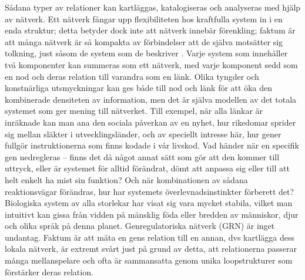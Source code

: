 Sådana typer av relationer kan kartläggas, katalogiseras och analyseras med hjälp av nätverk. Ett nätverk fångar upp flexibiliteten hos kraftfulla system in i en enda struktur; detta betyder dock inte att nätverk innebär förenkling; faktum är att många nätverk är så kompakta av förbindelser att de själva motsätter sig tolkning, just såsom de system som de beskriver \citep{dianati2016unwinding}. Varje system som innehåller två komponenter kan summeras som ett nätverk, med varje komponent sedd som en nod och deras relation till varandra som en länk. Olika tyngder och konstnärliga utsmyckningar kan ges både till nod och länk för att öka den kombinerade densiteten av information, men det är själva modellen av det totala systemet som ger mening till nätverket. Till exempel, när alla länkar är inräknade kan man ana den sociala påverkan av en nyhet, hur rikedomar sprider sig mellan släkter i utvecklingsländer, och av speciellt intresse här, hur gener fullgör instruktionerna som finns kodade i vår livskod. Vad händer när en specifik gen nedregleras – finns det då något annat sätt som gör att den kommer till uttryck, eller är systemet för alltid förändrat, dömt att anpassa sig eller till att helt enkelt ha mist sin funktion? Och när kombinationen av sådana reaktionsvägar förändras, hur har systemets överlevnadsinstinkter förberett det? Biologiska system av alla storlekar har visat sig vara mycket stabila, vilket man intuitivt kan gissa från vidden på mänsklig föda eller bredden av människor, djur och olika språk på denna planet. Genregulatoriska nätverk (GRN) är inget undantag. Faktum är att mäta en gens relation till en annan, dvs kartlägga dess lokala nätverk, är extremt svårt just på grund av detta, att relationerna passerar många mellanspelare och ofta är sammansatta genom unika loopstrukturer som förstärker deras relation. 



